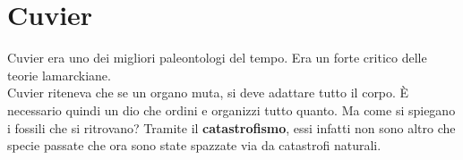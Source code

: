 
\section{Cuvier}
Cuvier era uno dei migliori paleontologi del tempo. Era un forte critico delle teorie lamarckiane.\\
Cuvier riteneva che se un organo muta, si deve adattare tutto il corpo. È necessario quindi un
dio che ordini e organizzi tutto quanto. Ma come si spiegano i fossili che si ritrovano? Tramite
il \textbf{catastrofismo}, essi infatti non sono altro che specie passate che ora sono state spazzate
via da catastrofi naturali.

